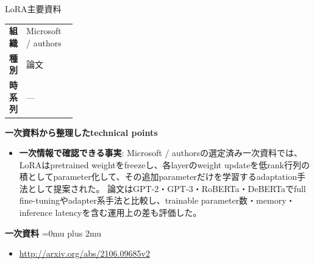 \begin{technicalnote}{LoRA}{主要資料}
\begingroup
\begin{tabularx}{\linewidth}{@{}>{\bfseries}p{0.22\linewidth}X@{}}
組織 & Microsoft / authors \\
種別 & 論文 \\
時系列 & — \\
\end{tabularx}
\smallskip
{\bfseries 一次資料から整理したtechnical points}
\begin{itemize}[leftmargin=1.5em,itemsep=0.35em]
\item \textbf{一次情報で確認できる事実}: Microsoft / authorsの選定済み一次資料では、LoRAはpretrained weightをfreezeし、各layerのweight updateを低rank行列の積としてparameter化して、その追加parameterだけを学習するadaptation手法として提案された。 論文はGPT-2・GPT-3・RoBERTa・DeBERTaでfull fine-tuningやadapter系手法と比較し、trainable parameter数・memory・inference latencyを含む運用上の差も評価した。
\end{itemize}
\begin{minipage}{\linewidth}
\begin{samepage}
{\bfseries 一次資料}
\begingroup\sloppy
\Urlmuskip=0mu plus 2mu\relax
\begin{itemize}[leftmargin=1.5em,itemsep=0.25em]
\item {\scriptsize\url{http://arxiv.org/abs/2106.09685v2}}
\end{itemize}
\endgroup
\end{samepage}
\end{minipage}
\endgroup
\end{technicalnote}
\medskip
